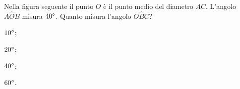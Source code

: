 \begin{esercizio}
\label{ese:5.68}
Nella figura seguente il punto $O$ è il punto medio del diametro $AC$. L'angolo $A\widehat{O}B$ misura $40{}^{\circ}$. Quanto misura l'angolo $O\widehat{B}C$? 
\begin{multicols}{4}
\begin{enumeratea}
\item $10{}^{\circ}$;
\item $20{}^{\circ}$;
\item $40{}^{\circ}$;
\item $60{}^{\circ}$.
\end{enumeratea}
\end{multicols}
\end{esercizio}
